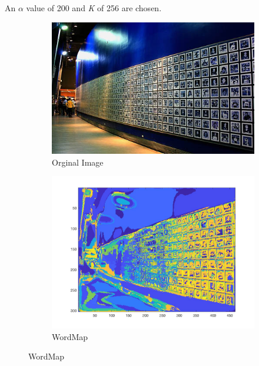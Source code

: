 \documentclass[a4paper,11pt]{article}
\begin{document}
An $\alpha$ value of 200 and \textit{K} of 256 are chosen.

\vfill
\begin{figure}
	\centering
	\begin{subfigure}{.5\textwidth}
		\centering
		\includegraphics[width=\textwidth]{release/matlab/fig4}
		\caption{Orginal Image}
		\label{fig:sub1}
	\end{subfigure}%
	\begin{subfigure}{.5\textwidth}
		\centering
		\includegraphics[width=\textwidth]{release/matlab/WordMap4}
		\caption{WordMap}
		\label{fig:sub2}
	\end{subfigure}
\end{figure}
\end{document}

